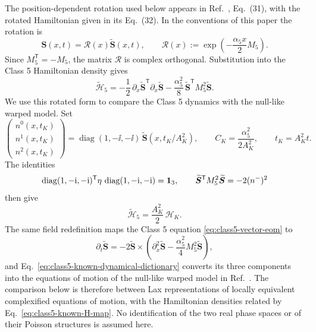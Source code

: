 The position-dependent rotation used below appears in
Ref.~\cite{deLeeuwFontanellaNietoGarcia2026}, Eq.~(31), with the rotated
Hamiltonian given in its Eq.~(32).  In the conventions of this paper the
rotation is
\begin{equation}
\boldsymbol S(x,t)
=\mathcal R(x)\widetilde{\boldsymbol S}(x,t),
\qquad
\mathcal R(x):=
\exp\!\left(-\frac{\alpha_5x}{2}M_5\right).
\label{eq:class5-known-field-rotation}
\end{equation}
Since $M_5^{\mathsf T}=-M_5$, the matrix $\mathcal R$ is complex orthogonal.
Substitution into the Class 5 Hamiltonian density gives
\begin{equation}
\widetilde{\mathcal H}_5
=-\frac12\,
\partial_x\widetilde{\boldsymbol S}^{\mathsf T}
\partial_x\widetilde{\boldsymbol S}
-\frac{\alpha_5^2}{8}\,
\widetilde{\boldsymbol S}^{\mathsf T}M_5^2
\widetilde{\boldsymbol S}.
\label{eq:class5-known-rotated-H}
\end{equation}
We use this rotated form to compare the Class 5 dynamics with the null-like
warped model.  Set
\begin{equation}
\begin{pmatrix}n^0(x,t_K)\\ n^1(x,t_K)\\ n^2(x,t_K)\end{pmatrix}
=
\operatorname{diag}(1,-\ii,-\ii)\,
\widetilde{\boldsymbol S}(x,t_K/A_K^2),
\qquad
C_K=\frac{\alpha_5^2}{2A_K^2},
\qquad
t_K=A_K^2t.
\label{eq:class5-known-dynamical-dictionary}
\end{equation}
The identities
\begin{equation}
\operatorname{diag}(1,-\mathrm{i},-\mathrm{i})^{\mathsf T}
\eta\,
\operatorname{diag}(1,-\mathrm{i},-\mathrm{i})=\mathbf{1}_3,
\qquad
\widetilde{\boldsymbol S}^{\mathsf T}M_5^2
\widetilde{\boldsymbol S}=-2(n^-)^2
\label{eq:class5-known-H-identities}
\end{equation}
then give
\begin{equation}
\widetilde{\mathcal H}_5
=\frac{A_K^2}{2}\,\mathcal H_K.
\label{eq:class5-known-H-map}
\end{equation}
The same field redefinition maps the Class 5 equation
\eqref{eq:class5-vector-eom} to
\begin{equation}
\partial_t\widetilde{\boldsymbol S}
=-2\widetilde{\boldsymbol S}\times
\left(
\partial_x^2\widetilde{\boldsymbol S}
-\frac{\alpha_5^2}{4}M_5^2\widetilde{\boldsymbol S}
\right),
\label{eq:class5-known-rotated-eom}
\end{equation}
and Eq.~\eqref{eq:class5-known-dynamical-dictionary} converts its three
components into the equations of motion of the null-like warped model in
Ref.~\cite{KameyamaYoshida2014}.  The comparison below is therefore between
Lax representations of locally equivalent complexified equations of motion,
with the Hamiltonian densities related by Eq.~\eqref{eq:class5-known-H-map}.
No identification of the two real phase spaces or of their Poisson structures
is assumed here.

